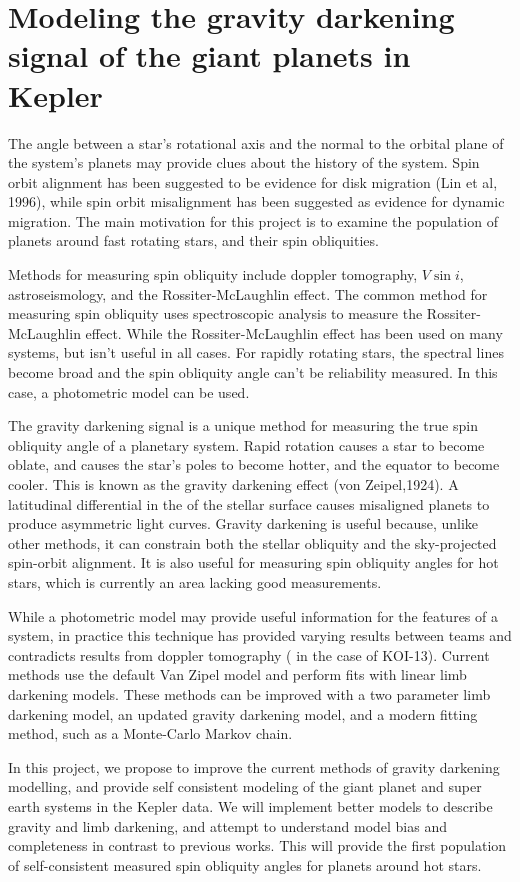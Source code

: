 \documentclass{article}
\begin{document}
\section*{Modeling the gravity darkening signal of the giant planets in Kepler}
The angle between a star's rotational axis and the normal to the orbital plane of the system's planets may provide clues about the history of the system.
Spin orbit alignment has been suggested to be evidence for disk migration (Lin et al, 1996), while spin orbit misalignment has been suggested as evidence for dynamic migration.
The main motivation for this project is to examine the population of planets around fast rotating stars, and their spin obliquities.

Methods for measuring spin obliquity include doppler tomography, $V\sin i$, astroseismology, and the Rossiter-McLaughlin effect.
The common method for measuring spin obliquity uses spectroscopic analysis to measure the Rossiter-McLaughlin effect.
While the Rossiter-McLaughlin effect has been used on many systems, but isn't useful in all cases.
For rapidly rotating stars, the spectral lines become broad and the spin obliquity angle can't be reliability measured.
In this case, a photometric model can be used.


The gravity darkening signal is a unique method for measuring the true spin obliquity angle of a planetary system.
Rapid rotation causes a star to become oblate, and causes the star's poles to become hotter, and the equator to become cooler.
This is known as the gravity darkening effect (von Zeipel,1924).
A latitudinal differential in the of the stellar surface causes misaligned planets to produce asymmetric light curves.
Gravity darkening is useful because, unlike other methods, it can constrain both the stellar obliquity and the sky-projected spin-orbit alignment.
It is also useful for measuring spin obliquity angles for hot stars, which is currently an area lacking good measurements.


While a photometric model may provide useful information for the features of a system, in practice this technique has provided varying results between teams and contradicts  results from doppler tomography ( in the case of KOI-13).
Current methods use the default Van Zipel model and perform fits with linear limb darkening models.
These methods can be improved with a two parameter limb darkening model, an updated gravity darkening model, and a modern fitting method, such as a Monte-Carlo Markov chain.


In this project, we propose to improve the current methods of gravity darkening modelling, and provide self consistent modeling of the giant planet and super earth systems in the Kepler data.
We will implement better models to describe gravity and limb darkening, and attempt to understand model bias and completeness in contrast to previous works.
This will provide the first population of self-consistent measured spin obliquity angles for planets around hot stars.
\end{document}
